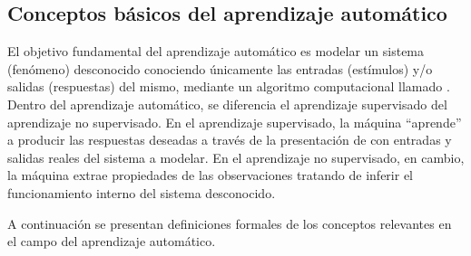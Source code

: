 %
%
\subsection{Conceptos básicos del aprendizaje automático}
%
El objetivo fundamental del aprendizaje automático es modelar un
sistema (fenómeno) desconocido conociendo únicamente las entradas
(estímulos) y/o salidas (respuestas) del mismo, mediante un
algoritmo computacional llamado .
Dentro del aprendizaje automático, se diferencia el aprendizaje
supervisado del aprendizaje no supervisado.
En el aprendizaje supervisado, la máquina ``aprende''
a producir las respuestas deseadas a través de la presentación de
 con entradas y salidas reales del sistema a modelar.
En el aprendizaje no supervisado, en cambio, la máquina extrae 
propiedades de las observaciones tratando de inferir el
funcionamiento interno del sistema desconocido.

A continuación se presentan definiciones formales de los conceptos
relevantes en el campo del aprendizaje automático.
